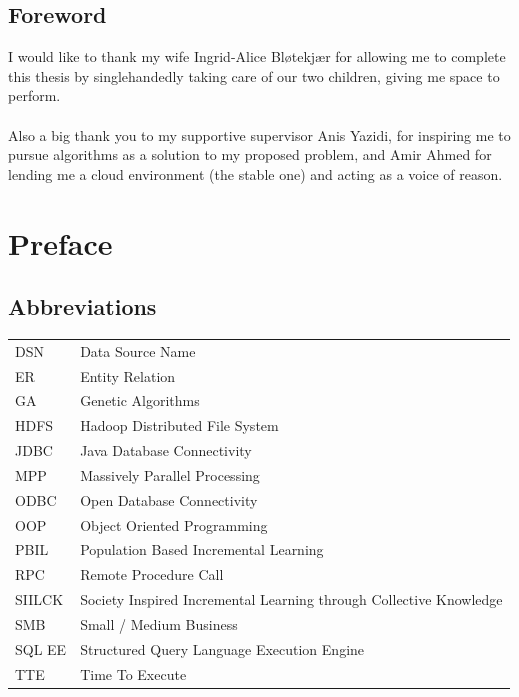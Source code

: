 \documentclass[a4paper,english]{report}
\begin{document}
	\pagebreak
	\section{Foreword}
	
	I would like to thank my wife Ingrid-Alice Bløtekjær for allowing me to complete this thesis by singlehandedly taking care of our two children, giving me space to perform.
	\\
	\\
	Also a big thank you to my supportive supervisor Anis Yazidi, for inspiring me to pursue algorithms as a solution to my proposed problem, and Amir Ahmed for lending me a cloud environment (the stable one) and acting as a voice of reason.
	
	\tableofcontents
	
	\chapter{Preface}
	\section{Abbreviations}
	\label{word_list}
	\begin{table}[h]
		\centering
		\begin{tabular}{ll}
			
			DSN & Data Source Name \\
			ER & Entity Relation \\
			GA & Genetic Algorithms \\
			HDFS & Hadoop Distributed File System \\
			JDBC & Java Database Connectivity \\
			MPP & Massively Parallel Processing \\
			ODBC & Open Database Connectivity \\
			OOP	& Object Oriented Programming \\
			PBIL & Population Based Incremental Learning \\
			RPC & Remote Procedure Call \\
			SIILCK & Society Inspired Incremental Learning through Collective Knowledge \\
			SMB & Small / Medium Business \\
			SQL EE & Structured Query Language Execution Engine \\
			TTE	& Time To Execute \\
			
		\end{tabular}
	\end{table}
\end{document}
